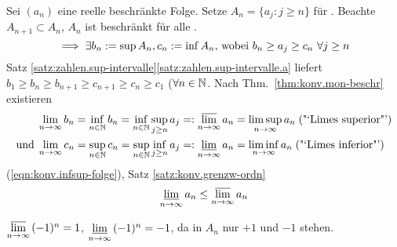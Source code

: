 \documentclass[12pt]{scrreprt}
\begin{document}
\noindent Sei $(a_n)$ eine reelle beschränkte Folge. Setze
$A_n=\{a_j:j\ge n\}$ für . Beachte $A_{n+1}\subset A_n$, $A_n$
ist beschränkt für alle .
\begin{equation} \label{eqn:konv.infsup-folge} \implies \exists
  b_n:=\sup{A_n}, c_n:=\inf{A_n}\text{, wobei } b_n \ge a_j \ge c_n \
  \forall j \ge n
\end{equation}
Satz
\ref{satz:zahlen.sup-intervalle}\ref{satz:zahlen.sup-intervalle.a}
liefert $b_1 \ge b_n \ge b_{n+1} \ge c_{n+1} \ge c_n \ge c_1$
($\forall n\in\mathbb{N}$. Nach Thm.~\ref{thm:konv.mon-beschr} existieren
\begin{equation} \begin{split} \label{eqn:konv.def-limsupinf}
    \lim_{n\rightarrow\infty}{b_n} = \inf_{n\in\mathbb{N}}{b_n} = \inf_{n\in\mathbb{N}}{\sup_{j\ge n}{a_j}} &=: \varlimsup_{n\rightarrow\infty}{a_n} = \limsup_{n\rightarrow\infty}{a_n}\;\text{("`Limes superior"')}\\
    \text{und}\;
    \lim_{n\rightarrow\infty}{c_n} = \sup_{n\in\mathbb{N}}{c_n} = \sup_{n\in\mathbb{N}}{\inf_{j\ge n}{a_j}} &=: \varliminf_{n\rightarrow\infty}{a_n} = \liminf_{n\rightarrow\infty}{a_n}\;\text{("`Limes inferior"')}\\
  \end{split} \end{equation} (\ref{eqn:konv.infsup-folge}), Satz
\ref{satz:konv.grenzw-ordn}
\folgt \begin{equation} \label{eqn:konv.ordn-limsupinf}
  \varliminf_{n\rightarrow\infty}{a_n}\le\varlimsup_{n\rightarrow\infty}{a_n} \end{equation}
\begin{bsp*}
  $\varlimsup\limits_{n\rightarrow\infty}{(-1)^n}=1$, $\varliminf\limits_{n\rightarrow\infty}{(-1)^n}=-1$, da
  in $A_n$ nur $+1$ und $-1$ stehen.
\end{bsp*}
\end{document}
